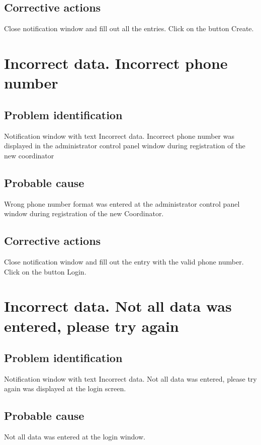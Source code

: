 \subsection{Corrective actions}
Close notification window and fill out all the entries. Click on the button Create.


\section{Incorrect data. Incorrect phone number}

\subsection{Problem identification}
Notification window with text Incorrect data. Incorrect phone number
was displayed in the administrator control panel window during registration of the new coordinator

\subsection{Probable cause}
Wrong phone number format was entered at the administrator control panel window
during registration of the new Coordinator.

\subsection{Corrective actions}
Close notification window and fill out the entry with the valid phone number. Click on the button Login.


\section{Incorrect data. Not all data was entered, please try again}

\subsection{Problem identification}
Notification window with text Incorrect data. Not all data was entered, please try again
was displayed at the login screen.

\subsection{Probable cause}
Not all data was entered at the login window.

